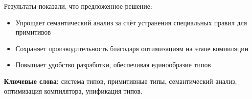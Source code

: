 \medskip

Результаты показали, что предложенное решение:

\begin{itemize}[leftmargin=*,label={--}]
    \item Упрощает семантический анализ за счёт устранения специальных правил для примитивов
    \item Сохраняет производительность благодаря оптимизациям на этапе компиляции
    \item Повышает удобство разработки, обеспечивая единообразие типов
\end{itemize}

\textbf{Ключевые слова:} система типов, примитивные типы, семантический анализ, оптимизация компилятора, унификация типов.

\newpage